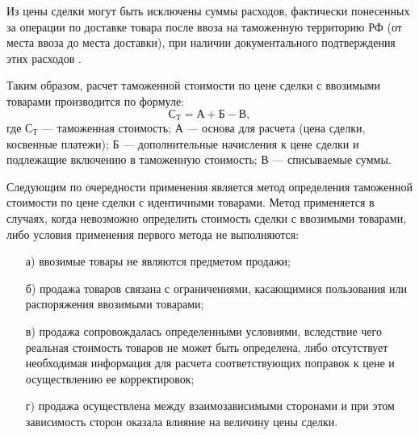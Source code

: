 Из цены сделки могут быть исключены суммы расходов, фактически понесенных за операции по доставке товара после ввоза на таможенную территорию РФ (от места ввоза до места доставки), при наличии документального подтверждения этих расходов \cites[с. 260--263]{mahovikova}[с. 528]{pokrovskaya}.

Таким образом, расчет таможенной стоимости по цене сделки с ввозимыми товарами производится по формуле:
\[\text{С}_\text{Т} = \text{А} + \text{Б} - \text{В}, \] где $\text{С}_\text{Т}$ --- таможенная стоимость; $\text{А}$ --- основа для расчета (цена сделки, косвенные платежи); $\text{Б}$ --- дополнительные начисления к цене сделки и подлежащие включению в таможенную стоимость; $\text{В}$ --- списываемые суммы.

Следующим по очередности применения является метод определения таможенной стоимости по цене сделки с идентичными товарами. Метод применяется в случаях, когда невозможно определить стоимость сделки с ввозимыми товарами, либо условия применения первого метода не выполняются:
\begin{enumerate}
	\item [а)] ввозимые товары не являются предметом продажи;
	\item [б)] продажа товаров связана с ограничениями, касающимися пользования или распоряжения ввозимыми товарами;
	\item [в)] продажа сопровождалась определенными условиями, вследствие чего реальная стоимость товаров не может быть определена, либо отсутствует необходимая информация для расчета соответствующих поправок к цене и осуществлению ее корректировок;
	\item [г)] продажа осуществлена между взаимозависимыми сторонами и при этом зависимость сторон оказала влияние на величину цены сделки.
\end{enumerate}










